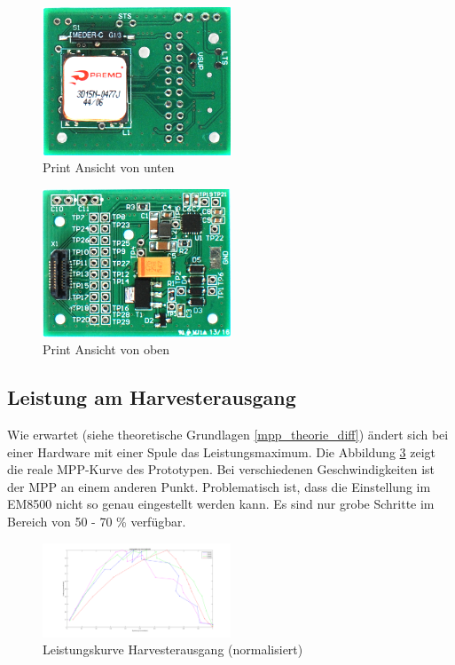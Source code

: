 \begin{figure}[ht]
    \includegraphics[width=0.5\textwidth]{4Resultate/imag/print_rueckseite.png} 
    \caption{Print Ansicht von unten}
    \label{print_rueckseite}
\end{figure}

\begin{figure}[ht]
    \includegraphics[width=0.5\textwidth]{4Resultate/imag/print_vorne.png} 
    \caption{Print Ansicht von oben}
    \label{print_vorne}
\end{figure}

\subsection{Leistung am Harvesterausgang}

Wie erwartet (siehe theoretische Grundlagen \ref{mpp_theorie_diff}) ändert sich bei einer Hardware mit einer Spule das Leistungsmaximum. Die Abbildung \ref{mpp_resultat_harvester} zeigt die reale MPP-Kurve des Prototypen. Bei verschiedenen Geschwindigkeiten ist der MPP an einem anderen Punkt. Problematisch ist, dass die Einstellung im EM8500 nicht so genau eingestellt werden kann. Es sind nur grobe Schritte im Bereich von 50 - 70 \% verfügbar. 

\begin{figure}[ht]
    \includegraphics[width=0.5\textwidth]{4Resultate/imag/MPPHarvester.png} 
    \caption{Leistungskurve Harvesterausgang (normalisiert)}
    \label{mpp_resultat_harvester}
\end{figure}

